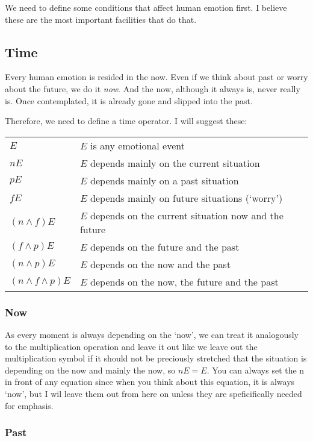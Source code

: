 \documentclass{scrartcl}
\begin{document}
We need to define some conditions that affect human emotion first. I believe these are the most important facilities that
do that.

\subsection{Time}

Every human emotion is resided in the now. Even if we think about past or worry about the future, we do it \textit{now}.
And the now, although it always is, never really is. Once contemplated, it is already gone and slipped into the past.

Therefore, we need to define a time operator. I will suggest these:

\begin{tabular}{l|l}
	$E$           & $E$ is any emotional event \\
	$n E$ & $E$ depends mainly on the current situation \\
	$p E$ & $E$ depends mainly on a past situation \\
	$f E$ & $E$ depends mainly on future situations (`worry') \\
	$(n \wedge f) E$ & $E$ depends on the current situation now and the future \\
	$(f \wedge p) E$ & $E$ depends on the future and the past \\
	$(n \wedge p) E$ & $E$ depends on the now and the past \\
	$(n \wedge f \wedge p) E$ & $E$ depends on the now, the future and the past
\end{tabular}

\subsubsection{Now}

As every moment is always depending on the `now', we can treat it analogously to the multiplication operation 
and leave it out like we leave out the multiplication symbol if it should not be preciously stretched that the
situation is depending on the now and mainly the now, so $n E = E$. You can always set the n in front of
any equation since when you think about this equation, it is always `now', but I wil leave them out from here on
unless they are speficifically needed for emphasis.

\subsubsection{Past}
\end{document}
